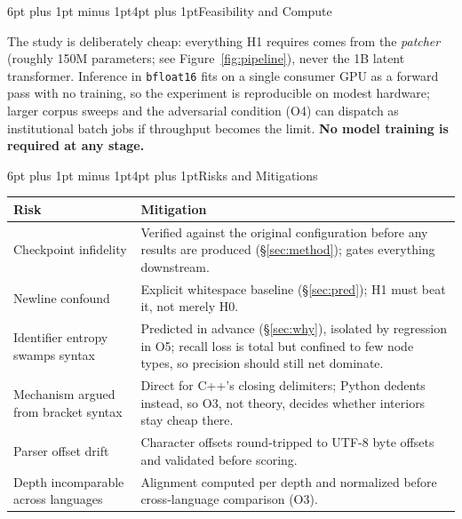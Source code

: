 \documentclass[10pt]{article}
\makeatletter
\renewcommand\section{\@startsection{section}{1}{0pt}%
  {6pt plus 1pt minus 1pt}{4pt plus 1pt}{\normalfont\large\bfseries}}
\newcommand{\code}[1]{\texttt{\small #1}}
\makeatother
\begin{document}
\section{Feasibility and Compute}

The study is deliberately cheap: everything H1 requires comes from the
\emph{patcher} (roughly 150M parameters; see Figure~\ref{fig:pipeline}), never
the 1B latent transformer. Inference in \code{bfloat16} fits
on a single consumer GPU as a forward pass with no training, so the experiment
is reproducible on modest hardware; larger corpus sweeps and the adversarial
condition (O4) can dispatch as institutional batch jobs if throughput becomes
the limit. \textbf{No model training is required at any stage.}

\section{Risks and Mitigations}

\noindent
\begin{center}
\small
\begin{tabular}{@{}p{2.4cm}p{5.5cm}@{}}
\toprule
\textbf{Risk} & \textbf{Mitigation} \\
\midrule
Checkpoint infidelity &
Verified against the original configuration before any results are produced
(\S\ref{sec:method}); gates everything downstream. \\[1pt]
Newline confound &
Explicit whitespace baseline (\S\ref{sec:pred}); H1 must beat it, not merely H0. \\[1pt]
Identifier entropy swamps syntax &
Predicted in advance (\S\ref{sec:why}), isolated by regression in O5; recall
loss is total but confined to few node types, so precision should still net
dominate. \\[1pt]
Mechanism argued from bracket syntax &
Direct for C++'s closing delimiters; Python dedents instead, so O3, not
theory, decides whether interiors stay cheap there. \\[1pt]
Parser offset drift &
Character offsets round-tripped to UTF-8 byte offsets and validated before scoring. \\[1pt]
Depth incomparable across languages &
Alignment computed per depth and normalized before cross-language comparison (O3). \\
\bottomrule
\end{tabular}
\label{tab:risks}
\end{center}
\end{document}

